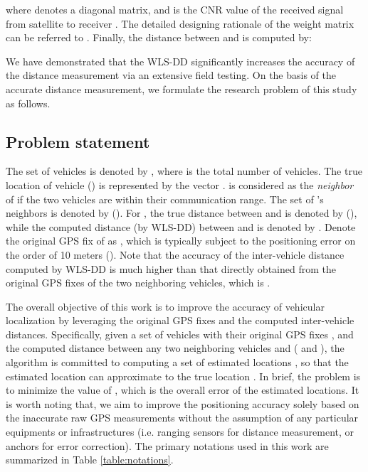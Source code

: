 \documentclass[letterpaper, 10 pt, conference]{ieeeconf}
\begin{document}
where   denotes a diagonal matrix, and  is the CNR value of the received signal from  satellite  to receiver . The detailed designing rationale of the weight matrix  can be referred to \cite{yang2012vehicle}. Finally, the distance between   and  is computed by:


We have demonstrated that the WLS-DD significantly increases the accuracy of the distance measurement via an extensive field testing. On the basis of the accurate distance measurement, we formulate the research problem of this study as follows.

\subsection{Problem statement}
The set of vehicles is denoted by , where  is the total number of vehicles. The true location of vehicle  () is represented by the vector .  is considered as the \emph{neighbor} of  if the two vehicles are within their communication range. The set of 's neighbors is denoted by  (). For , the true distance between  and   is denoted by  (), while the computed distance (by WLS-DD) between  and   is denoted by . Denote the original GPS fix of   as , which is typically  subject to the positioning error on the order of 10 meters (\cite{boukerche2008vehicular, schubert2007accurate}). Note that the accuracy of the  inter-vehicle distance computed by WLS-DD is much higher than that directly obtained from the original GPS fixes of the two neighboring vehicles, which is .

The overall objective of this work is to improve the accuracy of vehicular localization by leveraging the original GPS fixes and the computed inter-vehicle distances. Specifically, given a set of vehicles  with their original GPS fixes , and the computed distance   between any two neighboring vehicles  and  ( and ), the algorithm is committed to computing a set of estimated locations , so that the estimated location  can approximate to the true location  . In brief, the problem is to minimize the value of , which is the overall error of the estimated locations. It is worth noting that, we aim to improve the positioning accuracy solely based on the inaccurate raw GPS measurements without the assumption of any particular equipments or infrastructures (i.e. ranging sensors for distance measurement, or anchors for error correction). The primary notations used in this work are summarized in Table \ref{table:notations}.
\end{document}
